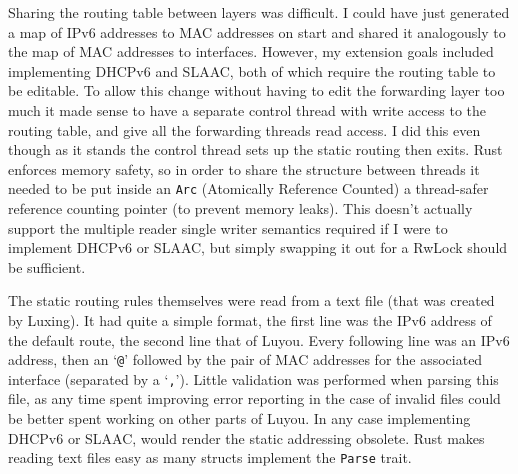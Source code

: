 \documentclass[12pt,a4paper,twoside,openright]{report}
\begin{document}
\bigskip

Sharing the routing table between layers was difficult.  I could have just generated a map of IPv6 addresses to MAC addresses on start and shared it analogously to the map of MAC addresses to interfaces. However, my extension goals included implementing DHCPv6 and SLAAC, both of which require the routing table to be editable.  To allow this change without having to edit the forwarding layer too much it made sense to have a separate control thread with write access to the routing table, and give all the forwarding threads read access.  I did this even though as it stands the control thread sets up the static routing then exits.  Rust enforces memory safety, so in order to share the structure between threads it needed to be put inside an \verb!Arc! (Atomically Reference Counted)\cite{rust_arc} a thread-safer reference counting pointer (to prevent memory leaks).  This doesn't actually support the multiple reader single writer semantics required if I were to implement DHCPv6 or SLAAC, but simply swapping it out for a RwLock\cite{rust_rwlock} should be sufficient.

\bigskip

The static routing rules themselves were read from a text file (that was created by Luxing). It had quite a simple format, the first line was the IPv6 address of the default route, the second line that of Luyou.  Every following line was an IPv6 address, then an `\verb!@!' followed by the pair of MAC addresses for the associated interface (separated by a `\verb!,!').  Little validation was performed when parsing this file, as any time spent improving error reporting in the case of invalid files could be better spent working on other parts of Luyou.  In any case implementing DHCPv6 or SLAAC, would render the static addressing obsolete. Rust makes reading text files easy as many structs implement the \verb!Parse! trait.

\bigskip
\end{document}
